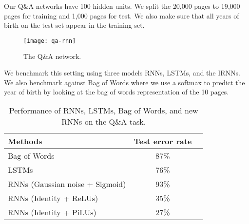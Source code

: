 \documentclass{article} \usepackage{nips14submit_e,times,graphicx}
\begin{document}
Our Q\&A networks have 100 hidden units. We split the 20,000 pages to
19,000 pages for training and 1,000 pages for test. We also make sure
that all years of birth on the test set appear in the training set.

\begin{figure}[h!]
\centering
\texttt{[image: qa-rnn]}
\caption{The Q\&A network.}
\label{fig:qa}
\end{figure}

We benchmark this setting using three models RNNs, LSTMs, and the
IRNNs. We also benchmark against Bag of Words where we use a softmax
to predict the year of birth by looking at the bag of words
representation of the 10 pages.

\begin{table}[h!]
\centering
\begin{tabular}{|l|c|c|}
\hline
{\bf Methods}           &  {\bf Test error rate} \\\hline
Bag of Words            &  87\%           \\\hline
LSTMs                   &  76\%            \\\hline 
RNNs (Gaussian noise + Sigmoid)                    &  93\%            \\\hline
RNNs (Identity + ReLUs) &  35\%            \\\hline
RNNs (Identity + PiLUs) &  27\%            \\\hline
\end{tabular}
\caption{Performance of RNNs, LSTMs, Bag of Words, and new RNNs on the Q\&A task.}
\label{tab:mnist}
\end{table}
\fi



\end{document}
